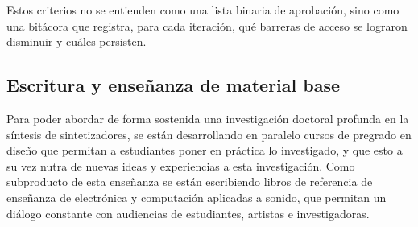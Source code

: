 \documentclass[../candidatura.tex]{subfiles}
\begin{document}
Estos criterios no se entienden como una lista binaria de aprobación, sino como una bitácora que registra, para cada iteración, qué barreras de acceso se lograron disminuir y cuáles persisten.

\subsection{Escritura y enseñanza de material base}

Para poder abordar de forma sostenida una investigación doctoral profunda en la síntesis de sintetizadores, se están desarrollando en paralelo cursos de pregrado en diseño que permitan a estudiantes poner en práctica lo investigado, y que esto a su vez nutra de nuevas ideas y experiencias a esta investigación. Como subproducto de esta enseñanza se están escribiendo libros de referencia de enseñanza de electrónica y computación aplicadas a sonido, que permitan un diálogo constante con audiencias de estudiantes, artistas e investigadoras.
\end{document}
